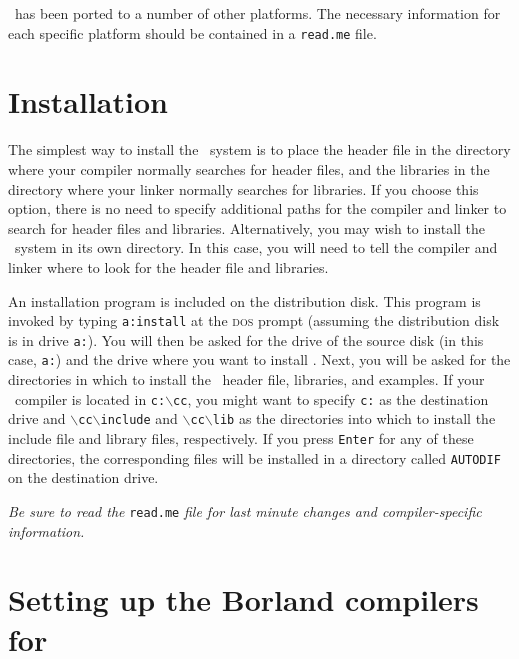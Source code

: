 \documentclass{admbmanual}
\newcommand\bs{$\backslash$}
\begin{document}
\scAD\ has been ported to a number of other platforms.
The necessary information for each specific platform should be
contained in a \texttt{read.me} file. 


\section{Installation}

The simplest way to install the \scAD\ system is to place the
header file in the directory where your compiler normally searches for
header files, and the libraries in
the directory where your linker normally searches for
libraries.
If you choose this option, there is no need to specify additional
paths for the compiler and linker to search for header files and libraries.
Alternatively, you may wish to install the \scAD\ system in its own
directory. In this case, you will need to tell the compiler and linker
where to look for the header file and libraries.

An installation program is included on the distribution disk.
This program is invoked by typing \texttt{a:install} at the \textsc{dos} prompt
(assuming the distribution disk is in drive \texttt{a:}).
You will then be asked for the drive of the source disk (in this case,
\texttt{a:}) and the drive where you want to install \scAD.
Next, you will be asked for the directories in which to
install the \scAD\ header file, libraries, and examples. 
If your \cplus\ compiler is located in \texttt{c:\bs cc}, you might
want to specify \texttt{c:} as the destination drive and
\texttt{\bs cc\bs include} and \texttt{\bs cc\bs lib} as the 
directories into which to
install the include file and library files, respectively.
If you press \texttt{Enter} for
any of these directories, the corresponding files will be installed in
a directory called \texttt{AUTODIF} on the destination drive.

\textit{Be sure to read the} \texttt{read.me} \textit{file for last minute changes and
compiler-specific information.}



\section{Setting up the Borland compilers for \scAD}
\end{document}
